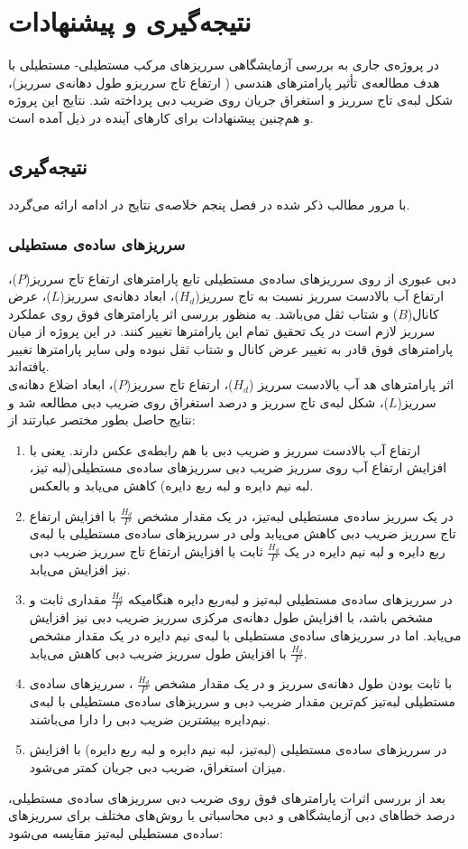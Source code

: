 \chapter{نتیجه‌گیری و پیشنهادات}
در پروژه‌ی جاری به بررسی آزمایشگاهی سرریزهای مرکب مستطیلی- مستطیلی با هدف مطالعه‌ی تأثیر پارامترهای هندسی ( ارتفاع تاج سرریزو طول دهانه‌ی سرریز)، شکل لبه‌ی تاج سرریز و استغراق جریان روی ضریب دبی پرداخته شد. نتایج این پروژه و هم‌چنین پیشنهادات برای کارهای آینده در ذیل آمده است.
\section{نتیجه‌گیری}
با مرور مطالب ذکر شده در فصل پنجم خلاصه‌ی نتایج در ادامه ارائه می‌گردد.
\subsection{سرریزهای ساده‌ی مستطیلی}
دبی عبوری از روی سرریزهای ساده‌ی مستطیلی تابع پارامترهای ارتفاع تاج سرریز($P$)، ارتفاع آب بالادست سرریز نسبت به تاج سرریز($H_d$)، ابعاد دهانه‌ی سرریز($L$)، عرض کانال($B$) و شتاب ثقل می‌باشد. به منظور بررسی اثر پارامترهای فوق روی عملکرد سرریز لازم است در یک تحقیق تمام این پارامترها تغییر کنند. در این پروژه از میان پارامترهای فوق قادر به تغییر عرض کانال و شتاب ثقل نبوده ولی سایر پارامترها تغییر یافته‌اند.\\
اثر پارامترهای هد آب بالادست سرریز ($H_d$)، ارتفاع تاج سرریز($P$)، ابعاد اضلاع دهانه‌ی سرریز($L$)، شکل لبه‌ی تاج سرریز و درصد استغراق روی ضریب دبی مطالعه شد و نتایج حاصل بطور مختصر عبارتند از:

\begin{enumerate}
\item		ارتفاع آب بالادست سرریز و ضریب دبی با هم رابطه‌ی عکس دارند. یعنی با افزایش ارتفاع آب روی سرریز ضریب دبی سرریزهای ساده‌ی مستطیلی(لبه تیز، لبه نیم دایره و لبه ربع دایره) کاهش می‌یابد و بالعکس.
\item	 	در یک سرریز ساده‌ی مستطیلی لبه‌تیز، در یک مقدار مشخص      $\frac{H_d}{P}$        با افزایش ارتفاع تاج سرریز ضریب دبی کاهش می‌یابد ولی در سرریزهای ساده‌ی مستطیلی با لبه‌ی ربع دایره و لبه نیم دایره در یک    $\frac{H_d}{P}$         ثابت با افزایش ارتفاع تاج سرریز ضریب دبی نیز افزایش می‌یابد.

\item در سرریزهای ساده‌ی مستطیلی لبه‌تیز و لبه‌‌ربع دایره هنگامیکه    $\frac{H_d}{P}$         مقداری ثابت و مشخص باشد، با افزایش طول دهانه‌ی مرکزی سرریز ضریب دبی نیز افزایش می‌یابد. اما در سرریزهای ساده‌ی مستطیلی با لبه‌ی نیم دایره در یک مقدار مشخص     $\frac{H_d}{P}$           با افزایش طول سرریز ضریب دبی کاهش می‌یابد.
\item		با ثابت بودن طول دهانه‌ی سرریز و در یک مقدار مشخص         $\frac{H_d}{P}$       ، سرریزهای ساده‌ی مستطیلی لبه‌تیز کم‌ترین مقدار ضریب دبی و سرریزهای ساده‌ی مستطیلی با لبه‌ی نیم‌دایره بیشترین ضریب دبی را دارا می‌باشند.
\item	در سرریزهای ساده‌ی مستطیلی (لبه‌تیز، لبه نیم دایره و لبه ربع دایره) با افزایش میزان استغراق، ضریب دبی جریان کمتر می‌شود. 
\end{enumerate}
بعد از بررسی اثرات پارامترهای فوق روی ضریب دبی سرریزهای ساده‌ی مستطیلی، درصد خطاهای دبی آزمایشگاهی و دبی محاسباتی با روش‌های مختلف برای سرریزهای ساده‌ی مستطیلی لبه‌تیز مقایسه می‌شود:

